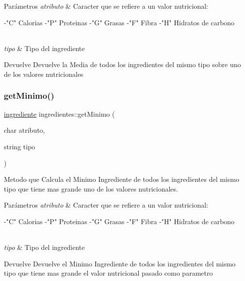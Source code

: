 \begin{DoxyParams}{Parámetros}
{\em atributo} & Caracter que se refiere a un valor nutricional\+: \begin{DoxyVerb}    -"C" Calorias
    -"P" Proteinas
    -"G" Grasas
    -"F" Fibra
    -"H" Hidratos de carbono
\end{DoxyVerb}
\\
\hline
{\em tipo} & Tipo del ingrediente \\
\hline
\end{DoxyParams}
\begin{DoxyReturn}{Devuelve}
Devuelve la Media de todos los ingredientes del mismo tipo sobre uno de los valores nutricionales 
\end{DoxyReturn}
\mbox{\label{classingredientes_a0ec4fb15cad1b31709b24751abdf2067}} 
\subsubsection{\texorpdfstring{get\+Minimo()}{getMinimo()}}
{\footnotesize\ttfamily \hyperlink{classingrediente}{ingrediente} ingredientes\+::get\+Minimo (\begin{DoxyParamCaption}\item[{char}]{atributo,  }\item[{string}]{tipo }\end{DoxyParamCaption})}



Metodo que Calcula el Minimo Ingrediente de todos los ingredientes del mismo tipo que tiene mas grande uno de los valores nutricionales. 


\begin{DoxyParams}{Parámetros}
{\em atributo} & Caracter que se refiere a un valor nutricional\+: \begin{DoxyVerb}    -"C" Calorias
    -"P" Proteinas
    -"G" Grasas
    -"F" Fibra
    -"H" Hidratos de carbono
\end{DoxyVerb}
\\
\hline
{\em tipo} & Tipo del ingrediente \\
\hline
\end{DoxyParams}
\begin{DoxyReturn}{Devuelve}
Devuelve el Minimo Ingrediente de todos los ingredientes del mismo tipo que tiene mas grande el valor nutricional pasado como parametro 
\end{DoxyReturn}
\mbox{\label{classingredientes_a4fc149d674b55f73c3079d58606e7e1c}} 
